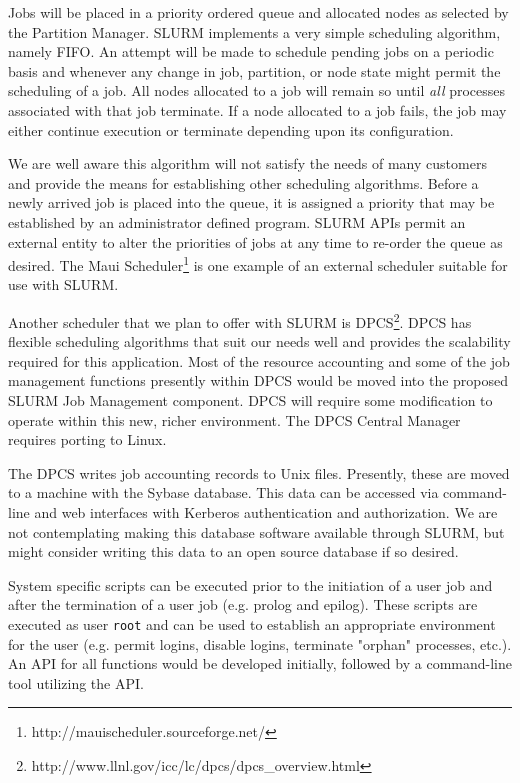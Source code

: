 Jobs will be placed in a priority ordered queue and allocated nodes as 
selected by the Partition Manager. 
SLURM implements a very simple scheduling algorithm, namely FIFO. 
An attempt will be made to schedule pending jobs on a periodic basis
and whenever any change in job, partition, or node state might permit
the scheduling of a job.  All nodes allocated to a job will remain so
until {\em all} processes associated with that job terminate.  If a
node allocated to a job fails, the job may either continue execution or
terminate depending upon its configuration.

We are well aware this algorithm will not satisfy the needs of many
customers and provide the means for establishing other scheduling
algorithms. Before a newly arrived job is placed into the queue, it
is assigned a priority that may be established by an administrator
defined program. SLURM APIs permit an external entity to alter the
priorities of jobs at any time to re-order the queue as desired.
The Maui Scheduler\footnote{http://mauischeduler.sourceforge.net/}
is one example of an external scheduler suitable for use with SLURM.

Another scheduler that we plan to offer with SLURM is
DPCS\footnote{http://www.llnl.gov/icc/lc/dpcs/dpcs\_overview.html}.  DPCS
has flexible scheduling algorithms that suit our needs well and provides
the scalability required for this application. Most of the resource
accounting and some of the job management functions presently within
DPCS would be moved into the proposed SLURM Job Management component.
DPCS will require some modification to operate within this new, richer
environment. The DPCS Central Manager requires porting to Linux.

The DPCS writes job accounting records to Unix files. Presently, these are
moved to a machine with the Sybase database. This data can be accessed
via command-line and web interfaces with Kerberos authentication and
authorization.  We are not contemplating making this database software
available through SLURM, but might consider writing this data to an open
source database if so desired.

System specific scripts can be executed prior to the initiation of a user
job and after the termination of a user job (e.g. prolog and epilog).
These scripts are executed as user {\tt root} and can be used to establish
an appropriate environment for the user (e.g. permit logins, disable
logins, terminate "orphan" processes, etc.).  An API for all functions
would be developed initially, followed by a command-line tool utilizing
the API.

